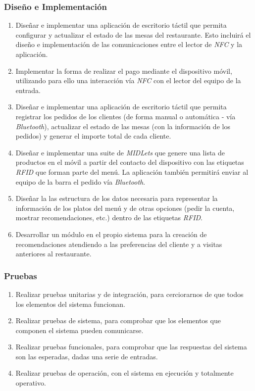 \subsubsection{Diseño e Implementación}
\begin{enumerate}
\item Diseñar e implementar una aplicación de escritorio táctil que permita
  configurar y actualizar el estado de las mesas del restaurante. Esto
  incluirá el diseño e implementación de las comunicaciones entre el lector
  de \emph{NFC} y la aplicación.
\item Implementar la forma de realizar el pago mediante el dispositivo móvil,
  utilizando para ello una interacción vía \emph{NFC} con el lector del equipo
  de la entrada.
\item Diseñar e implementar una aplicación de escritorio táctil que permita
  registrar los pedidos de los clientes (de forma manual o automática - vía
  \emph{Bluetooth}), actualizar el estado de las mesas (con la información de
  los pedidos) y generar el importe total de cada cliente.
\item Diseñar e implementar una suite de \emph{MIDLets} que genere una lista
  de productos en el móvil a partir del contacto del dispositivo con las
  etiquetas \emph{RFID} que forman parte del menú. La aplicación también
  permitirá enviar al equipo de la barra el pedido vía \emph{Bluetooth}.
\item Diseñar la las estructura de los datos necesaria para representar la
  información de los platos del menú y de otras opciones (pedir la cuenta, 
  mostrar recomendaciones, etc.) dentro de las etiquetas \emph{RFID}.
\item Desarrollar un módulo en el propio sistema para la creación de
  recomendaciones atendiendo a las preferencias del cliente y a visitas
  anteriores al restaurante.
\end{enumerate}

\subsubsection{Pruebas}
\begin{enumerate}
\item Realizar pruebas unitarias y de integración, para cerciorarnos de que
  todos los elementos del sistema funcionan.
\item Realizar pruebas de sistema, para comprobar que los elementos que
  componen el sistema pueden comunicarse.
\item Realizar pruebas funcionales, para comprobar que las respuestas del
  sistema son las esperadas, dadas una serie de entradas.
\item Realizar pruebas de operación, con el sistema en ejecución y totalmente
  operativo.
\end{enumerate}

